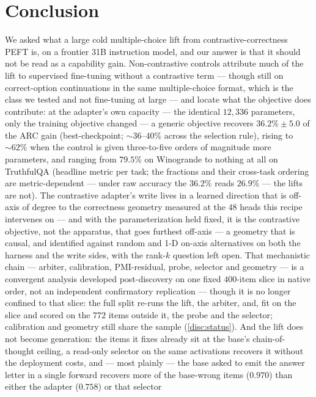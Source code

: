 \section{Conclusion}\label{sec:conclusion}

We asked what a large cold multiple-choice lift from contrastive-correctness PEFT
is, on a frontier 31B instruction model, and our answer is that it should not be read
as a capability gain. Non-contrastive controls attribute much of the lift to
supervised fine-tuning without a contrastive term --- though still on
correct-option continuations in the same multiple-choice format, which is the class we
tested and not fine-tuning at large --- and locate what the objective
does contribute: at the adapter's own capacity --- the identical $12{,}336$
parameters, only the training objective changed --- a generic objective recovers
$36.2\% \pm 5.0$ of the ARC gain (best-checkpoint; ${\sim}36$--$40\%$ across the
selection rule), rising to ${\sim}62\%$ when the control is given
three-to-five orders of magnitude more parameters, and ranging from $79.5\%$ on
Winogrande to nothing at all on TruthfulQA (headline metric per task; the fractions
and their cross-task ordering are metric-dependent --- under raw accuracy the $36.2\%$
reads $26.9\%$ --- the lifts are not). The contrastive adapter's write lives in a
learned direction that is off-axis of degree to the correctness geometry measured at
the $48$ heads this recipe intervenes on --- and with the
parameterization held fixed, it is the contrastive objective, not the apparatus, that
goes furthest off-axis --- a geometry that is causal, and identified against random
and 1-D on-axis alternatives on both the harness and the write sides, with the
rank-$k$ question left open. That mechanistic
chain --- arbiter, calibration,
PMI-residual, probe, selector and geometry --- is a convergent analysis developed
post-discovery on one fixed $400$-item slice in native order, not an independent
confirmatory replication --- though it is no longer confined to that slice: the full
split re-runs the lift, the arbiter, and, fit on the slice and scored on the $772$
items outside it, the probe and the selector; calibration and geometry still share the
sample (\cref{disc:status}). And the lift does not become generation: the items it
fixes already sit at the base's chain-of-thought ceiling, a read-only selector on the
same activations recovers it without the deployment costs, and --- most plainly ---
the base asked to emit the answer letter in a single forward recovers more of the
base-wrong items ($0.970$) than either the adapter ($0.758$) or that selector
